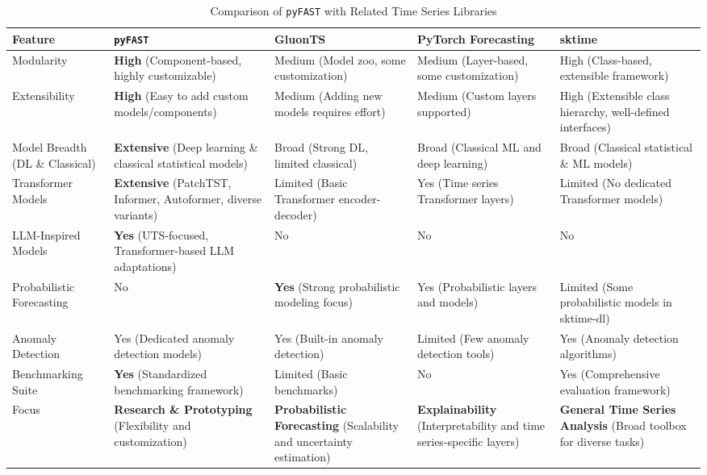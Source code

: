 \documentclass[twoside,11pt]{article}
\begin{document}
\begin{table*}[t!]
    \centering
    \caption{Comparison of \texttt{pyFAST} with Related Time Series Libraries}
    \label{tab:library_comparison}
    \begin{tabularx}{\textwidth}{@{}XXXXX@{}}
    \toprule
    Feature & \texttt{pyFAST} & GluonTS & PyTorch Forecasting & sktime \\
    \midrule
    Modularity & \textbf{High} (Component-based, highly customizable) & Medium (Model zoo, some customization) & Medium (Layer-based, some customization) & High (Class-based, extensible framework) \\
    Extensibility & \textbf{High} (Easy to add custom models/components) & Medium (Adding new models requires effort) & Medium (Custom layers supported) & High (Extensible class hierarchy, well-defined interfaces) \\
    Model Breadth (DL \& Classical) & \textbf{Extensive} (Deep learning \& classical statistical models) & Broad (Strong DL, limited classical) & Broad (Classical ML and deep learning) & Broad (Classical statistical \& ML models) \\
    Transformer Models & \textbf{Extensive} (PatchTST, Informer, Autoformer, diverse variants) & Limited (Basic Transformer encoder-decoder) & Yes (Time series Transformer layers) & Limited (No dedicated Transformer models) \\
    LLM-Inspired Models & \textbf{Yes} (UTS-focused, Transformer-based LLM adaptations) & No & No & No \\
    Probabilistic Forecasting & No & \textbf{Yes} (Strong probabilistic modeling focus) & Yes (Probabilistic layers and models) & Limited (Some probabilistic models in sktime-dl) \\
    Anomaly Detection & Yes (Dedicated anomaly detection models) & Yes (Built-in anomaly detection) & Limited (Few anomaly detection tools) & Yes (Anomaly detection algorithms) \\
    Benchmarking Suite & \textbf{Yes} (Standardized benchmarking framework) & Limited (Basic benchmarks) & No & Yes (Comprehensive evaluation framework) \\
    Focus & \textbf{Research \& Prototyping} (Flexibility and customization) & \textbf{Probabilistic Forecasting} (Scalability and uncertainty estimation) & \textbf{Explainability} (Interpretability and time series-specific layers) & \textbf{General Time Series Analysis} (Broad toolbox for diverse tasks) \\
    \bottomrule
    \end{tabularx}
\end{table*}
\end{document}
